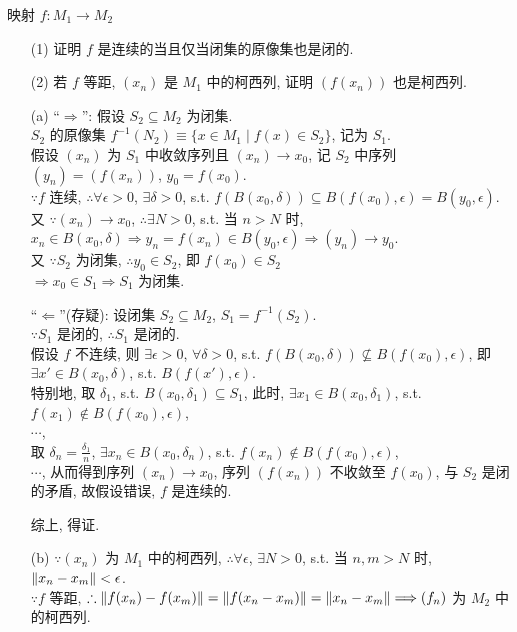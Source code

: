 \documentclass{assignment}
\begin{document}
\begin{prob}
    映射 $f:M_1\rightarrow M_2$
    \begin{itemize}
        \item[(1)] 证明 $f$ 是连续的当且仅当闭集的原像集也是闭的.
        \item[(2)] 若 $f$ 等距, $(x_n)$ 是 $M_1$ 中的柯西列, 证明 $(f(x_n))$ 也是柯西列.
    \end{itemize}
\end{prob}
\begin{sol}
    \begin{itemize}
        \item[(a)] ``$\Longrightarrow$'': 假设 $S_2\subseteq M_2$ 为闭集.\\
        $S_2$ 的原像集 $f^{-1}(N_2)\equiv\{x\in M_1\mid f(x)\in S_2\}$, 记为 $S_1$.\\
        假设 $(x_n)$ 为 $S_1$ 中收敛序列且 $(x_n)\rightarrow x_0$, 记 $S_2$ 中序列 $(y_n)=(f(x_n))$, $y_0=f(x_0)$.\\
        $\because f$ 连续, $\therefore\forall\epsilon>0$, $\exists\delta>0$, s.t. $f(B(x_0,\delta))\subseteq B(f(x_0),\epsilon)=B(y_0,\epsilon)$.\\
        又 $\because(x_n)\rightarrow x_0$, $\therefore\exists N>0$, s.t. 当 $n>N$ 时, $x_n\in B(x_0,\delta)\Longrightarrow y_n=f(x_n)\in B(y_0,\epsilon)\Longrightarrow(y_n)\rightarrow y_0$.\\
        又 $\because S_2$ 为闭集, $\therefore y_0\in S_2$, 即 $f(x_0)\in S_2$\\
        $\Longrightarrow x_0\in S_1\Longrightarrow S_1$ 为闭集.

        ``$\Longleftarrow$''(存疑): 设闭集 $S_2\subseteq M_2$, $S_1=f^{-1}(S_2)$.\\
        $\because S_1$ 是闭的, $\therefore S_1$ 是闭的.\\
        假设 $f$ 不连续, 则 $\exists\epsilon>0$, $\forall\delta>0$, s.t. $f(B(x_0,\delta))\nsubseteq B(f(x_0),\epsilon)$, 即 $\exists x'\in B(x_0,\delta)$, s.t. $B(f(x'),\epsilon)$.\\
        特别地, 取 $\delta_1$, s.t. $B(x_0,\delta_1)\subseteq S_1$, 此时, $\exists x_1\in B(x_0,\delta_1)$, s.t. $f(x_1)\notin B(f(x_0),\epsilon)$,\\
        $\cdots$,\\
        取 $\delta_n=\frac{\delta_1}{n}$, $\exists x_n\in B(x_0,\delta_n)$, s.t. $f(x_n)\notin B(f(x_0),\epsilon)$,\\
        $\cdots$, 从而得到序列 $(x_n)\rightarrow x_0$, 序列 $(f(x_n))$ 不收敛至 $f(x_0)$, 与 $S_2$ 是闭的矛盾, 故假设错误, $f$ 是连续的.

        综上, 得证.
        \item[(b)] $\because(x_n)$ 为 $M_1$ 中的柯西列, $\therefore\forall\epsilon$, $\exists N>0$, s.t. 当 $n,m>N$ 时, $\left\lVert x_n-x_m\right\rVert<\epsilon$.\\
        $\because f$ 等距, $\therefore\left\lVert f(x_n)-f(x_m)\right\rVert=\left\lVert f(x_n-x_m)\right\rVert=\left\lVert x_n-x_m\right\rVert\Longrightarrow(f_n)$ 为 $M_2$ 中的柯西列.
    \end{itemize}
\end{sol}
\end{document}
